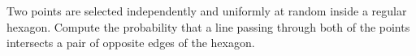 Two points are selected independently and uniformly at random inside a regular hexagon. Compute the probability that a line passing through both of the points intersects a pair of opposite edges of the hexagon.